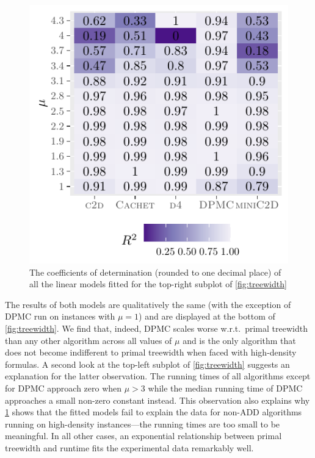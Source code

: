 \documentclass[runningheads]{llncs}
\begin{document}
\begin{figure}[t]
  \centering
  \includegraphics{r2}
  \caption{The coefficients of determination (rounded to one decimal place) of
    all the linear models fitted for the top-right subplot of
    \cref{fig:treewidth}}\label{fig:r2}
\end{figure}

The results of both models are qualitatively the same (with the exception of
\textsc{DPMC} run on instances with $\mu = 1$) and are displayed at the bottom
of \cref{fig:treewidth}. We find that, indeed, \textsc{DPMC} scales worse
w.r.t.\ primal treewidth than any other algorithm across all values of $\mu$ and
is the only algorithm that does not become indifferent to primal treewidth when
faced with high-density formulas. A second look at the top-left subplot of
\cref{fig:treewidth} suggests an explanation for the latter observation. The
running times of all algorithms except for \textsc{DPMC} approach zero when
$\mu > 3$ while the median running time of \textsc{DPMC} approaches a small
non-zero constant instead. This observation also explains why \cref{fig:r2}
shows that the fitted models fail to explain the data for non-ADD algorithms
running on high-density instances---the running times are too small to be
meaningful. In all other cases, an exponential relationship between primal
treewidth and runtime fits the experimental data remarkably well.
\end{document}
